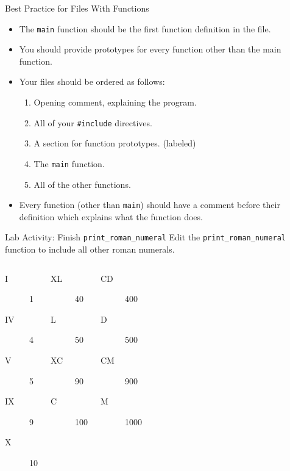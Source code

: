\documentclass[]{beamer}
\begin{document}
\begin{frame}{Best Practice for Files With Functions}
    \begin{itemize}[<+->]
        \item The \texttt{main} function should be the first function
            definition in the file.
        \item You should provide prototypes for every function other
            than the main function.
        \item Your files should be ordered as follows:
        \begin{enumerate}
            \item Opening comment, explaining the program.
            \item All of your \texttt{\#include} directives.
            \item A section for function prototypes. (labeled)
            \item The \texttt{main} function.
            \item All of the other functions.
        \end{enumerate}
        \item Every function (other than \texttt{main}) should have
            a comment before their definition which explains what the
            function does.
    \end{itemize}
\end{frame}

\begin{frame}{Lab Activity: Finish \texttt{print\_roman\_numeral}}
    Edit the \texttt{print\_roman\_numeral} function to include all
    other roman numerals.

    \begin{columns}
    \begin{description}
        \item[I] 1
        \item[IV] 4
        \item[V] 5
        \item[IX] 9
        \item[X] 10
    \end{description}
    \begin{description}
        \item[XL] 40
        \item[L] 50
        \item[XC] 90
        \item[C] 100
    \end{description}
    \begin{description}
        \item[CD] 400
        \item[D] 500
        \item[CM] 900
        \item[M] 1000
    \end{description}
    \end{columns}
\end{frame}
\end{document}
